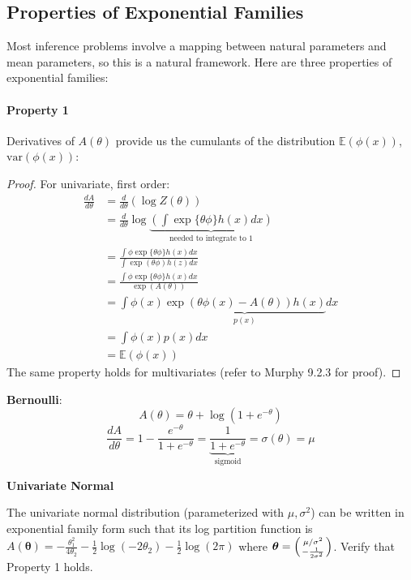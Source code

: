 \documentclass{article}
\begin{document}
\subsection{Properties of Exponential Families}
Most inference problems involve a mapping between natural parameters and mean parameters, so this is a natural framework. Here are three properties of exponential families:

\paragraph{Property 1} Derivatives of $A(\theta)$ provide us the cumulants of the distribution $\mathbb{E}(\phi(x))$, $\text{var}(\phi(x))$:
\begin{proof}
For univariate, first order:
\begin{align*}
\frac{d A}{d \theta} &= \frac{d}{d\theta}(\log Z(\theta)) \\
&= \frac{d}{d \theta} \log \underbrace{\left(\int \exp\{\theta \phi\} h(x) dx\right)}_{\text{needed to integrate to $1$}} \\
&= \frac{\int\phi \exp\{\theta\phi\}h(x) dx}{\int \exp( \theta \phi) h(z) dx}\\
&= \frac{\int\phi \exp\{\theta\phi\}h(x) dx}{\exp(A(\theta))} \\
&= \int \phi(x) \underbrace{\exp(\theta \phi(x) - A(\theta)) h(x)}_{p(x)} dx\\
&= \int \phi(x) p(x) dx \\
&= \mathbb{E}(\phi(x))
\end{align*}
The same property holds for multivariates (refer to Murphy 9.2.3 for proof). 
\end{proof}

\textbf{Bernoulli}: 
\[A(\theta) = \theta + \log(1 + e^{-\theta})\]
\[\frac{d A}{d\theta} = 1 - \frac{e^{-\theta}}{1 + e^{-\theta}} = \underbrace{\frac{1}{1 + e^{-\theta}}}_{\text{sigmoid}} = \sigma(\theta) = \mu \]

\textbf{Univariate Normal}
\begin{exercise}
The univariate normal distribution (parameterized with $\mu, \sigma^{2}$) can be written in exponential family form such that its log partition function is $A(\bm{\theta}) = -\frac{\theta_{1}^{2}}{4\theta_{2}} - \frac{1}{2}\log(-2\theta_{2}) - \frac{1}{2}\log(2\pi)$ where $\bm{\theta} = \left(\mu/\sigma^{2} \atop -\frac{1}{2\sigma^{2}}\right)$. Verify that Property 1 holds.
\end{exercise}
\end{document}
